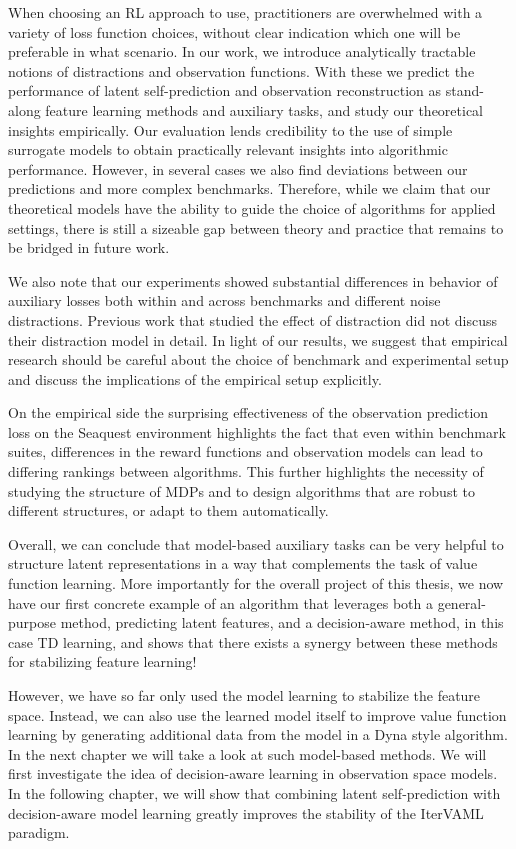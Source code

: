 When choosing an RL approach to use, practitioners are overwhelmed with a variety of loss function choices, without clear indication which one will be preferable in what scenario.
In our work, we introduce analytically tractable notions of distractions and observation functions.
With these we predict the performance of latent self-prediction and observation reconstruction as stand-along feature learning methods and auxiliary tasks, and study our theoretical insights empirically.
Our evaluation lends credibility to the use of simple surrogate models to obtain practically relevant insights into algorithmic performance.
However, in several cases we also find deviations between our predictions and more complex benchmarks.
Therefore, while we claim that our theoretical models have the ability to guide the choice of algorithms for applied settings, there is still a sizeable gap between theory and practice that remains to be bridged in future work.

We also note that our experiments showed substantial differences in behavior of auxiliary losses both within and across benchmarks and different noise distractions.
Previous work that studied the effect of distraction \parencite{nikishin2021control,voelcker2022value,ni2024bridging} did not discuss their distraction model in detail. 
In light of our results, we suggest that empirical research should be careful about the choice of benchmark and experimental setup and discuss the implications of the empirical setup explicitly.

On the empirical side the surprising effectiveness of the observation prediction loss on the Seaquest environment highlights the fact that even within benchmark suites, differences in the reward functions and observation models can lead to differing rankings between algorithms.
This further highlights the necessity of studying the structure of MDPs and to design algorithms that are robust to different structures, or adapt to them automatically.

Overall, we can conclude that model-based auxiliary tasks can be very helpful to structure latent representations in a way that complements the task of value function learning.
More importantly for the overall project of this thesis, we now have our first concrete example of an algorithm that leverages both a general-purpose method, predicting latent features, and a decision-aware method, in this case TD learning, and shows that there exists a synergy between these methods for stabilizing feature learning!

However, we have so far only used the model learning to stabilize the feature space.
Instead, we can also use the learned model itself to improve value function learning by generating additional data from the model in a Dyna style algorithm.
In the next chapter we will take a look at such model-based methods.
We will first investigate the idea of decision-aware learning in observation space models.
In the following chapter, we will show that combining latent self-prediction with decision-aware model learning greatly improves the stability of the IterVAML paradigm.